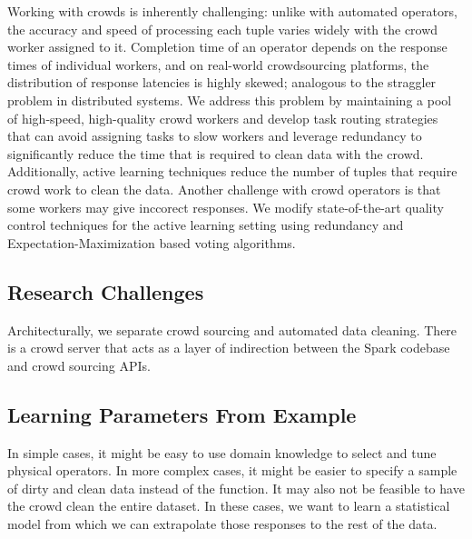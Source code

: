 Working with crowds is inherently challenging: unlike with automated operators, the accuracy and speed of processing each tuple varies widely with the crowd worker assigned to it.
Completion time of an operator depends on the response times of individual workers, and on real-world crowdsourcing 
platforms, the distribution of response latencies is highly skewed; analogous to the straggler problem in distributed systems.
We address this problem by maintaining a pool of high-speed, high-quality crowd workers and develop task routing strategies 
that can avoid assigning tasks to slow workers and leverage redundancy to significantly reduce the time that is required to clean 
data with the crowd. Additionally, active learning techniques reduce the number of tuples that require crowd work to clean the
data.
Another challenge with crowd operators is that some workers may give inccorect responses.
We modify state-of-the-art quality control techniques for the active learning setting using redundancy and Expectation-Maximization based voting algorithms.

\vspace{-0.25cm}


\iffalse
\subsection{Research Challenges}

Architecturally, we separate crowd sourcing and automated data cleaning.
There is a crowd server that acts as a layer of indirection between the Spark codebase and crowd sourcing APIs.




\subsection{Learning Parameters From Example}
In simple cases, it might be easy to use domain knowledge to select and tune physical operators. 
In more complex cases, it might be easier to specify a sample of dirty and clean data instead of the function.
It may also not be feasible to have the crowd clean the entire dataset.
In these cases, we want to learn a statistical model from which we can extrapolate those responses to the rest 
of the data.

